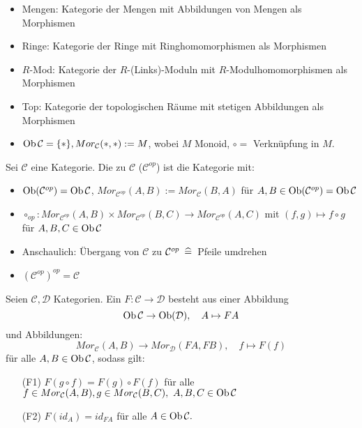 \begin{bsp}
	\begin{itemize}
		\item Mengen: Kategorie der Mengen mit Abbildungen von Mengen als Morphismen
		\item Ringe: Kategorie der Ringe mit Ringhomomorphismen als Morphismen
		\item $R$-Mod: Kategorie der $R$-(Links)-Moduln mit $R$-Modulhomomorphismen als Morphismen
		\item Top: Kategorie der topologischen Räume mit stetigen Abbildungen als Morphismen
		\item $\text{Ob}\,\mathcal{C}=\{\ast\}, Mor_{\mathcal{C}}(\ast,\ast) := M $, wobei $M$ Monoid, $\circ = $ Verknüpfung in $M$.
	\end{itemize}
\end{bsp}
\begin{df}\label{4.3}
	Sei $\mathcal{C}$  eine Kategorie. Die zu $\mathcal{C}$   ($\mathcal{C}^{op}$) ist die Kategorie mit: 
	\begin{itemize}
		\item $\text{Ob}(\mathcal{C}^{op}) = \text{Ob}\,\mathcal{C}$, $Mor_{\mathcal{C}^{op}}(A,B) := Mor_{\mathcal{C}}(B,A)$ für $A,B \in \text{Ob}(\mathcal{C}^{op}) = \text{Ob}\,\mathcal{C}$
		\item $\circ_{op}: Mor_{\mathcal{C}^{op}}(A,B) \times Mor_{\mathcal{C}^{op}}(B,C) \to Mor_{\mathcal{C}^{op}}(A,C) $ mit $(f,g) \mapsto f \circ g $ für $A,B,C \in \text{Ob}\,\mathcal{C}$
	\end{itemize}
\end{df}
\begin{anm}
	\begin{itemize}
		\item  Anschaulich: Übergang von $\mathcal{C}$ zu  $\mathcal{C}^{op} \ \, \widehat{=} \, $ Pfeile umdrehen
		\item $(\mathcal{C}^{op})^{op} = \mathcal{C}$
	\end{itemize}
\end{anm}
\begin{df}\label{4.4}
	Seien $\mathcal{C}, \mathcal{D} $ Kategorien. Ein  $F: \mathcal{C} \to \mathcal{D} $ besteht aus einer Abbildung $$ \text{Ob}\,\mathcal{C} \to \text{Ob}(\mathcal{D}), \quad A \mapsto FA$$
	und Abbildungen: $$ Mor_{\mathcal{C}}(A,B) \to Mor_{\mathcal{D}}(FA,FB), \quad f \mapsto F(f) $$ für alle $A,B \in \text{Ob}\,\mathcal{C}$, sodass gilt:
	\begin{enumerate}
		\item[(F1)] $F(g \circ f) = F(g) \circ F(f) $ für alle $ f \in Mor_{\mathcal{C}}(A,B), g\in Mor_{\mathcal{C}}(B,C), \ A,B,C \in \text{Ob}\,\mathcal{C}$
		\item[(F2)] $F(id_A) =id_{FA} $ für alle $A \in \text{Ob}\,\mathcal{C}.$
	\end{enumerate}
\end{df}
